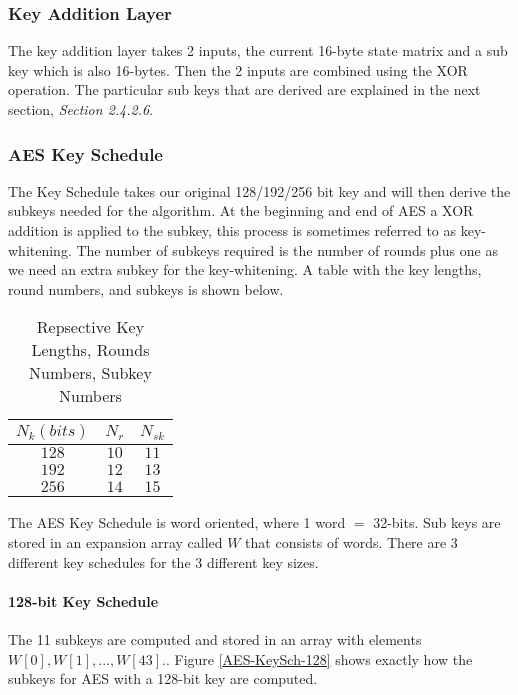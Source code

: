 \subsubsection{Key Addition Layer}

The key addition layer takes 2 inputs, the current 16-byte state matrix and a sub key which is also 16-bytes. Then the 2 inputs are combined using the XOR operation. The particular sub keys that are derived are explained in the next section, \textit{Section 2.4.2.6}.

\subsubsection{AES Key Schedule}

The Key Schedule takes our original 128/192/256 bit key and will then derive the subkeys needed for the algorithm. At the beginning and end of AES a XOR addition is applied to the subkey, this process is sometimes referred to as key-whitening. The number of subkeys required is the number of rounds plus one as we need an extra subkey for the key-whitening. A table with the key lengths, round numbers, and subkeys is shown below.

\begin{table}[H]
\begin{center}
\begin{tabular}{ c|c|c } 
$N_k (bits)$ & $N_r$ & $N_{sk}$ \\
\hline
$128$ & $10$ & $11$ \\
$192$ & $12$ & $13$ \\
$256$ & $14$ & $15$ \\
\end{tabular}
\caption{Repsective Key Lengths, Rounds Numbers, Subkey Numbers}
\label{AES-KeyL-RoundNumber-Subkeys}
\end{center}
\end{table}

The AES Key Schedule is word oriented, where 1 word $=$ 32-bits. Sub keys are stored in an expansion array called $W$ that consists of words. There are 3 different key schedules for the 3 different key sizes.

\paragraph{128-bit Key Schedule}

The 11 subkeys are computed and stored in an array with elements $W[0], W[1], ..., W[43].$. Figure \ref{AES-KeySch-128} shows exactly how the subkeys for AES with a 128-bit key are computed. 

